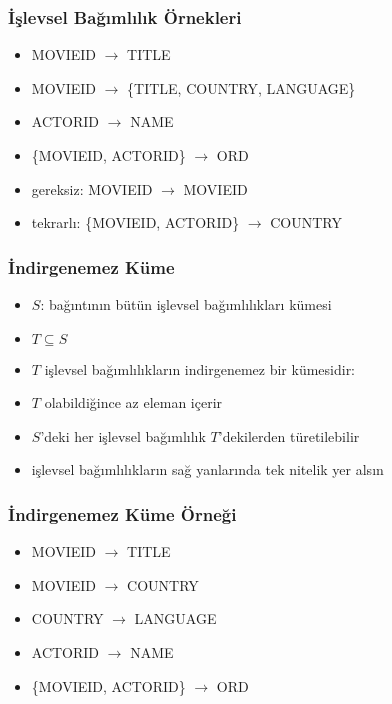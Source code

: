 \documentclass[dvipsnames]{beamer}
\theoremstyle{theorem}
\begin{document}
\begin{frame}
  \frametitle{İşlevsel Bağımlılık Örnekleri}
  
  \begin{itemize}
    \item MOVIEID $\rightarrow$ TITLE
    \item MOVIEID $\rightarrow$ \{TITLE, COUNTRY, LANGUAGE\}
    \item ACTORID $\rightarrow$ NAME
    \item \{MOVIEID, ACTORID\} $\rightarrow$ ORD

    \pause
    \medskip
    \item gereksiz: MOVIEID $\rightarrow$ MOVIEID
    \item tekrarlı: \{MOVIEID, ACTORID\} $\rightarrow$ COUNTRY
  \end{itemize}
\end{frame}

\begin{frame}
  \frametitle{İndirgenemez Küme}

  \begin{itemize}
    \item $S$: bağıntının bütün işlevsel bağımlılıkları kümesi
    \item $T \subseteq S$

    \medskip
    \item $T$ işlevsel bağımlılıkların indirgenemez bir kümesidir:

    \smallskip
    \item $T$ olabildiğince az eleman içerir
    \item $S$'deki her işlevsel bağımlılık $T$'dekilerden türetilebilir

    \pause
    \medskip
    \item işlevsel bağımlılıkların sağ yanlarında tek nitelik yer alsın
  \end{itemize}
\end{frame}


\begin{frame}
  \label{example_db_1}
  \frametitle{İndirgenemez Küme Örneği}

    \begin{itemize}
       \item MOVIEID $\rightarrow$ TITLE
       \item MOVIEID $\rightarrow$ COUNTRY
       \item COUNTRY $\rightarrow$ LANGUAGE
       \item ACTORID $\rightarrow$ NAME
       \item \{MOVIEID, ACTORID\} $\rightarrow$ ORD
  \end{itemize}
\end{frame}
\end{document}
